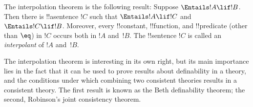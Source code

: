 \documentclass[../../../include/open-logic-section]{subfiles}
\begin{document}

The interpolation theorem is the following result: Suppose
$\Entails !A \lif !B$. Then there is !!a{sentence} $!C$ such that
$\Entails !A \lif !C$ and $\Entails !C \lif !B$.  Moreover, every
!!{constant}, !!{function}, and !!{predicate} (other than $\eq$) in
$!C$ occurs both in $!A$ and~$!B$. The !!{sentence} $!C$ is called an
\emph{interpolant} of $!A$ and~$!B$.

The interpolation theorem is interesting in its own right, but its
main importance lies in the fact that it can be used to prove results
about definability in a theory, and the conditions under which
combining two consistent theories results in a consistent theory.  The
first result is known as the Beth definability theorem; the second,
Robinson's joint consistency theorem.
\end{document}
